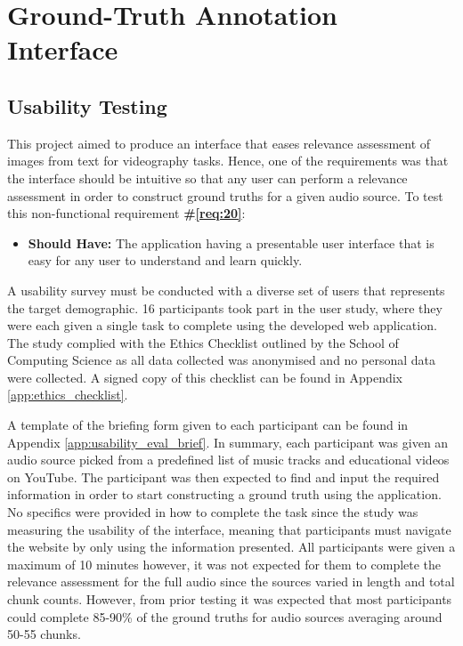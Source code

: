 \documentclass{l4proj}
\begin{document}
\section{Ground-Truth Annotation Interface}
\subsection{Usability Testing}
\label{sec:usability_testing}
This project aimed to produce an interface that eases relevance assessment of images from text for videography tasks. Hence, one of the requirements was that the interface should be intuitive so that any user can perform a relevance assessment in order to construct ground truths for a given audio source. To test this non-functional requirement \textbf{\#\ref{req:20}}:

\begin{itemize}
    \item \textbf{Should Have:} The application having a presentable user interface that is easy for any user to understand and learn quickly.
\end{itemize}

A usability survey must be conducted with a diverse set of users that represents the target demographic. 16 participants took part in the user study, where they were each given a single task to complete using the developed web application. The study complied with the Ethics Checklist outlined by the School of Computing Science as all data collected was anonymised and no personal data were collected. A signed copy of this checklist can be found in Appendix \ref{app:ethics_checklist}. 

A template of the briefing form given to each participant can be found in Appendix \ref{app:usability_eval_brief}. In summary, each participant was given an audio source picked from a predefined list of music tracks and educational videos on YouTube. The participant was then expected to find and input the required information in order to start constructing a ground truth using the application. No specifics were provided in how to complete the task since the study was measuring the usability of the interface, meaning that participants must navigate the website by only using the information presented. All participants were given a maximum of 10 minutes however, it was not expected for them to complete the relevance assessment for the full audio since the sources varied in length and total chunk counts. However, from prior testing it was expected that most participants could complete 85-90\% of the ground truths for audio sources averaging around 50-55 chunks.
\end{document}
